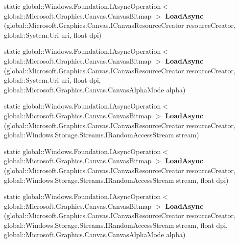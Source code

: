 \begin{DoxyCompactItemize}
static global\+::\+Windows.\+Foundation.\+I\+Async\+Operation$<$ global\+::\+Microsoft.\+Graphics.\+Canvas.\+Canvas\+Bitmap $>$ {\bfseries Load\+Async} (global\+::\+Microsoft.\+Graphics.\+Canvas.\+I\+Canvas\+Resource\+Creator resource\+Creator, global\+::\+System.\+Uri uri, float dpi)
\item 
\mbox{\label{class_microsoft_1_1_graphics_1_1_canvas_1_1_canvas_bitmap_aeebce5625f77585197137344e96fb39d}} 
static global\+::\+Windows.\+Foundation.\+I\+Async\+Operation$<$ global\+::\+Microsoft.\+Graphics.\+Canvas.\+Canvas\+Bitmap $>$ {\bfseries Load\+Async} (global\+::\+Microsoft.\+Graphics.\+Canvas.\+I\+Canvas\+Resource\+Creator resource\+Creator, global\+::\+System.\+Uri uri, float dpi, global\+::\+Microsoft.\+Graphics.\+Canvas.\+Canvas\+Alpha\+Mode alpha)
\item 
\mbox{\label{class_microsoft_1_1_graphics_1_1_canvas_1_1_canvas_bitmap_af12c77561765c9cbef9957e4bb137793}} 
static global\+::\+Windows.\+Foundation.\+I\+Async\+Operation$<$ global\+::\+Microsoft.\+Graphics.\+Canvas.\+Canvas\+Bitmap $>$ {\bfseries Load\+Async} (global\+::\+Microsoft.\+Graphics.\+Canvas.\+I\+Canvas\+Resource\+Creator resource\+Creator, global\+::\+Windows.\+Storage.\+Streams.\+I\+Random\+Access\+Stream stream)
\item 
\mbox{\label{class_microsoft_1_1_graphics_1_1_canvas_1_1_canvas_bitmap_ad38ec735e08607b9ecf7bbd6f1a7d229}} 
static global\+::\+Windows.\+Foundation.\+I\+Async\+Operation$<$ global\+::\+Microsoft.\+Graphics.\+Canvas.\+Canvas\+Bitmap $>$ {\bfseries Load\+Async} (global\+::\+Microsoft.\+Graphics.\+Canvas.\+I\+Canvas\+Resource\+Creator resource\+Creator, global\+::\+Windows.\+Storage.\+Streams.\+I\+Random\+Access\+Stream stream, float dpi)
\item 
\mbox{\label{class_microsoft_1_1_graphics_1_1_canvas_1_1_canvas_bitmap_a3f15d77e2e8485e54d0e45d2f972764d}} 
static global\+::\+Windows.\+Foundation.\+I\+Async\+Operation$<$ global\+::\+Microsoft.\+Graphics.\+Canvas.\+Canvas\+Bitmap $>$ {\bfseries Load\+Async} (global\+::\+Microsoft.\+Graphics.\+Canvas.\+I\+Canvas\+Resource\+Creator resource\+Creator, global\+::\+Windows.\+Storage.\+Streams.\+I\+Random\+Access\+Stream stream, float dpi, global\+::\+Microsoft.\+Graphics.\+Canvas.\+Canvas\+Alpha\+Mode alpha)

\end{DoxyCompactItemize}
